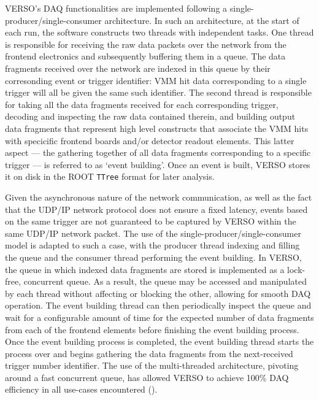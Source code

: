 VERSO's DAQ functionalities are implemented following a single-producer/single-consumer
architecture.
In such an architecture, at the start of each run, the software constructs two threads with independent
tasks.
One thread is responsible for receiving the raw data packets over the network from the
frontend electronics and subsequently buffering them in a queue.
The data fragments received over the network are indexed in this queue by their corresonding
event or trigger identifier: VMM hit data corresponding to a single trigger will all be given the
same such identifier.
The second thread is responsible for taking all the data fragments received for each corresponding
trigger, decoding and inspecting the raw data contained therein, and building output
data fragments that represent high level constructs that associate the VMM hits
with specicific frontend boards and/or detector readout elements.
This latter aspect --- the gathering together of all data fragments corresponding to a
specific trigger --- is referred to as `event building'.
Once an event is built, VERSO stores it on disk in the ROOT \texttt{TTree} format
for later analysis.

Given the asynchronous nature of the network communication, as well as the fact that the UDP/IP
network protocol does not ensure a fixed latency, events based on the same trigger
are not guaranteed to be captured by VERSO within the same UDP/IP network packet.
The use of the single-producer/single-consumer model is adapted to such a case, with
the producer thread indexing and filling the queue and the consumer thread performing the event building.
In VERSO, the queue in which indexed data fragments are stored is implemented
as a lock-free, concurrent queue.
As a result, the queue may be accessed and manipulated by each thread without affecting or blocking
the other, allowing for smooth DAQ operation.
The event building thread can then periodically inspect the queue and wait for a configurable amount of time for the expected
number of data fragments from each of the frontend elements before finishing
the event building process.
Once the event building process is completed,
the event building thread starts the process over and begins gathering the data fragments from the next-received trigger number identifier.
The use of the multi-threaded architecture, pivoting around a fast concurrent queue, has allowed VERSO to achieve 100\% DAQ efficiency
in all use-cases encountered ({\color{red}{Section XXX for use-cases}}).



\FloatBarrier
